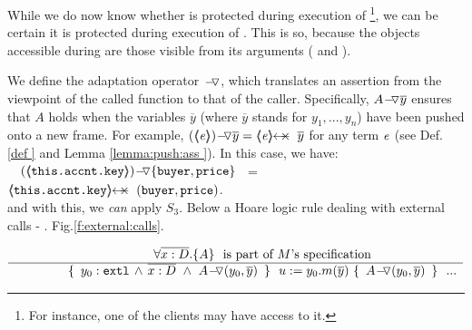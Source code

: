 
While we do now know whether  is protected during  execution of \footnote{For instance, one of the clients may have access to it.}, we can be certain it is protected during execution of .  This is so, because the objects accessible during  are those visible from its arguments (\ie {} and ).

We define the adaptation operator $\FIXSymbolA$, which translates an assertion from the viewpoint of the called function to that of the caller. 
Specifically, $\PushAS y A$ ensures that $A$ holds when the variables $\overline{y}$ (where $\overline{y}$ stands for $y_1, ..., y_n$) have been pushed onto a new frame. 
For example, $\PushAS y {(\inside \re)} = \protectedFrom \re {\overline{y}}$ for any term $\re$ (see Def. \ref{def
} and Lemma \ref{lemma:push:ass
}).
%
In this case, we have:\\  {\small{$\strut \ \ \ \PushASLong {\{\prg{buyer},\prg{price}\}}  {(\inside {\prg{this.\myAccount.key}})}$
 \ = \  $\protectedFrom {\prg{this.\myAccount.key}} {(\prg{buyer},\prg{price})}$.}}
 \\
 and with this, we \emph{can} apply $S_3$.
 {Below  a  Hoare logic rule  dealing with external calls - \cf. Fig.\ref{f:external:calls}.} %
 
 $\inferruleNoName  
 	{ 
   	   {\TwoStatesN {\overline {x:D}} {A}}\ \   \mbox{is part of $M$'s specification}
        }
	{   \triple { \    { \external{y_0}} \,     \wedge \,  \overline{x:D}\  \wedge\  {\PushASLong {(y_0,\overline y)}{A}} \ }  
						{ \ u:=y_0.m(\overline y)\    }
						{ \    {\PushASLong {(y_0,\overline y)}{A}}  \ }
						\  \  ...
         }
$

 
 
